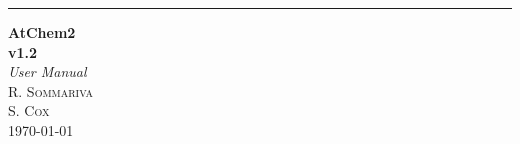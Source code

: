\documentclass[11pt,a4paper]{report}
\begin{document}
%
%

\begin{titlepage}
  \raggedleft   %
  \rule{1pt}{\textheight}  %
  \hspace{0.05\textwidth}
  \parbox[b]{0.75\textwidth}{
    {\Huge\bfseries AtChem2\\[0.5\baselineskip] v1.2}\\[2\baselineskip]  %
    {\LARGE\textit{User Manual}}\\[4\baselineskip]  %
    {\Large\textsc{R. Sommariva\\S. Cox}}  %
    \vspace{0.5\textheight}\\
    {\noindent \today}\\[\baselineskip]  %
    }

\end{titlepage}


\tableofcontents










\end{document}
